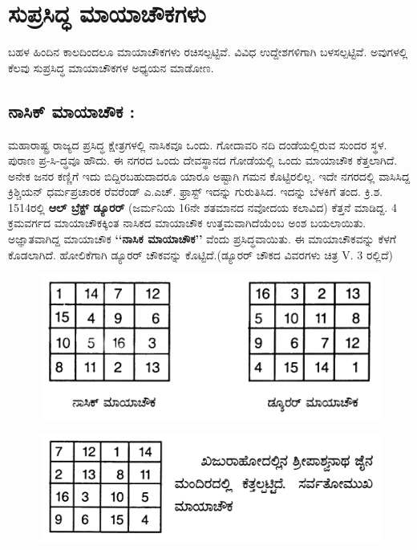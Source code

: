 \chapter{ಸುಪ್ರಸಿದ್ಧ ಮಾಯಾಚೌಕಗಳು}

ಬಹಳ ಹಿಂದಿನ ಕಾಲದಿಂದಲೂ ಮಾಯಾಚೌಕಗಳು ರಚಿಸಲ್ಪಟ್ಟಿವೆ. ವಿವಿಧ ಉದ್ದೇಶಗಳಿಗಾಗಿ ಬಳಸಲ್ಪಟ್ಟಿವೆ. ಅವುಗಳಲ್ಲಿ ಕೆಲವು ಸುಪ್ರಸಿದ್ಧ ಮಾಯಾಚೌಕಗಳ ಅಧ್ಯಯನ ಮಾಡೋಣ.

\section{ನಾಸಿಕ್ ಮಾಯಾಚೌಕ :}

ಮಹಾರಾಷ್ಟ್ರ ರಾಜ್ಯದ ಪ್ರಸಿದ್ಧ ಕ್ಷೇತ್ರಗಳಲ್ಲಿ ನಾಸಿಕವೂ ಒಂದು. ಗೋದಾವರಿ ನದಿ ದಂಡೆಯಲ್ಲಿರುವ ಸುಂದರ ಸ್ಥಳ. ಪುರಾಣ ಪ್ರ-ಸಿ-ದ್ಧವೂ ಹೌದು. ಈ ನಗರದ ಒಂದು ದೇವಸ್ಥಾನದ ಗೋಡೆಯಲ್ಲಿ ಒಂದು ಮಾಯಾಚೌಕ ಕೆತ್ತಲಾಗಿದೆ. ಅನೇಕ ಜನರ ಕಣ್ಣಿಗೆ ಇದು ಬಿದ್ದಿರಬಹುದಾದರೂ ಯಾರೂ ಅಷ್ಟಾಗಿ ಗಮನ ಕೊಟ್ಟಿರಲಿಲ್ಲ. ಇದೇ ನಗರದಲ್ಲಿ ವಾಸಿಸಿದ್ದ ಕ್ರಿಶ್ಚಿಯನ್ ಧರ್ಮಪ್ರಚಾರಕ ರೆವರೆಂಡ್ ಎ.ಎಚ್. ಫ್ರಾಸ್ಟ್ ಇದನ್ನು ಗುರುತಿಸಿದ. ಇದನ್ನು ಬೆಳಕಿಗೆ ತಂದ. ಕ್ರಿ.ಶ. 1514ರಲ್ಲಿ \textbf{ಆಲ್ ಬ್ರೆಕ್ಟ್ ಡ್ಯೂರರ್} (ಜರ್ಮನಿಯ 16ನೇ ಶತಮಾನದ ನವೋದಯ ಕಲಾವಿದ) ಕೆತ್ತನೆ ಮಾಡಿದ್ದ. 4 ಕ್ರಮವರ್ಗದ ಮಾಯಾಚೌಕಕ್ಕಿಂತ ನಾಸಿಕದ ಮಾಯಾಚೌಕ ಉತ್ತಮವಾಗಿದೆಯೆಂಬ ಅಂಶ ಬಯಲಾಯಿತು. ಅಜ್ಞಾತವಾಗಿದ್ದ ಮಾಯಾಚೌಕ \textbf{‘‘ನಾಸಿಕ ಮಾಯಾಚೌಕ’’} ವೆಂದು ಪ್ರಸಿದ್ಧವಾಯಿತು. ಈ ಮಾಯಾಚೌಕವನ್ನು ಕೆಳಗೆ ಕೊಡಲಾಗಿದೆ. ಹೋಲಿಕೆಗಾಗಿ ಡ್ಯೂರರ್ ಚೌಕವನ್ನು ಕೊಟ್ಟಿದೆ.(ಡ್ಯೂರರ್ ಚೌಕದ ವಿವರಗಳು ಚಿತ್ರ V. 3 ರಲ್ಲಿದೆ)
\begin{figure}[h]
\includegraphics{src/figures/chap4/fig4.1.jpg}
\end{figure}
\begin{figure}[h]
\includegraphics{src/figures/chap4/fig4.2.jpg}
\end{figure}

